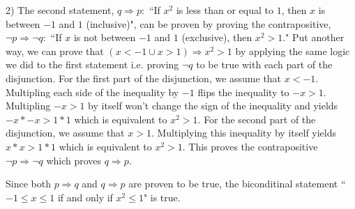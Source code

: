 \begin{paragraph}{2)}
		\leftIndent The second statement, $q \Rightarrow p:$ ``If $x^2$ is less
		than or equal to $1$, then $x$ is between $-1$ and $1$ (inclusive)", can be proven
		by proving the contrapositive, $\neg p \Rightarrow \neg q:$ ``If $x$ is not between $-1$ and $1$ (exclusive),
		then $x^2 > 1$." Put another way, we can prove that $(x < -1 \cup
		x > 1) \Rightarrow x^2 > 1$ by applying the same logic we did to the first statement i.e. proving 
		$\neg q$ to be true with each part of the disjunction. For the first part of the disjunction, 
		we assume that $x < -1$. Multipling each side of the inequality by $-1$
		flips the inequality to $-x > 1$. Multipling $-x > 1$ by itself won't change
		the sign of the inequality and yields $-x * -x > 1 * 1$ which is equivalent to $x^2 > 1$.
		For the second part of the disjunction, we assume that $x > 1$. Multiplying this inequality by 
		itself yields $x * x > 1 * 1$ which is equivalent to $x^2 > 1$. This proves the contrapositive
		$\neg p \Rightarrow \neg q$ which proves $q \Rightarrow p$. \spacing

		Since both $p \Rightarrow q$ and $q \Rightarrow p$ are proven to be true, the biconditinal statement
		``$-1 \leq x \leq 1$ if and only if $x^2 \leq 1$" is true. 
		
		\proofEnd

	\end{paragraph}

